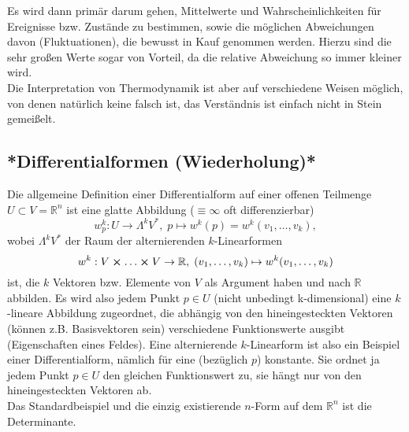 \documentclass[../KlassMech_main.tex]{subfiles}
\begin{document}
Es wird dann primär darum gehen, Mittelwerte und Wahrscheinlichkeiten für Ereignisse bzw. Zustände zu bestimmen, sowie die möglichen Abweichungen davon (Fluktuationen), die bewusst in Kauf genommen werden. Hierzu sind die sehr großen Werte sogar von Vorteil, da die relative Abweichung so immer kleiner wird.\\

Die Interpretation von Thermodynamik ist aber auf verschiedene Weisen möglich, von denen natürlich keine falsch ist, das Verständnis ist einfach nicht in Stein gemeißelt.


	\subsection{*Differentialformen (Wiederholung)*}
Die allgemeine Definition einer Differentialform auf einer offenen Teilmenge $U \subset V=\mathbb{R}^n$ ist eine glatte Abbildung ($\equiv \infty$ oft differenzierbar) 
\begin{equation}
w_p^k: U \rightarrow \Lambda^k V^*,\; p\mapsto w^k(p) = w^k(v_1, \dots,v_k),
\end{equation}
wobei $\Lambda^k V^*$ der Raum der alternierenden $k$-Linearformen 
\begin{equation}
w^k: V \cross \dots \cross V \rightarrow \mathbb{R},\; (v_1, \dots, v_k) \mapsto w^k(v_1, \dots, v_k)
\end{equation} 
ist, die $k$ Vektoren bzw. Elemente von $V$ als Argument haben und nach $\mathbb{R}$ abbilden. Es wird also jedem Punkt $p \in U$ (nicht unbedingt k-dimensional) eine $k$-lineare Abbildung zugeordnet, die abhängig von den hineingesteckten Vektoren (können z.B. Basisvektoren sein) verschiedene Funktionswerte ausgibt (Eigenschaften eines Feldes). Eine alternierende $k$-Linearform ist also ein Beispiel einer Differentialform, nämlich für eine (bezüglich $p$) konstante. Sie ordnet ja jedem Punkt $p \in U$ den gleichen Funktionswert zu, sie hängt nur von den hineingesteckten Vektoren ab.\\
Das Standardbeispiel und die einzig existierende $n$-Form auf dem $\mathbb{R}^n$ ist die Determinante.
\end{document}
